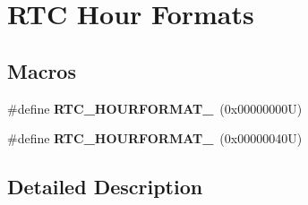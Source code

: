 \hypertarget{group___r_t_c___hour___formats}{}\section{R\+TC Hour Formats}
\label{group___r_t_c___hour___formats}
\subsection*{Macros}
\begin{DoxyCompactItemize}
\item 
\mbox{\label{group___r_t_c___hour___formats_gab1a861fd858a55a6e815be4585c413d5}} 
\#define {\bfseries R\+T\+C\+\_\+\+H\+O\+U\+R\+F\+O\+R\+M\+A\+T\+\_}~(0x00000000\+U)
\item 
\mbox{\label{group___r_t_c___hour___formats_ga8da8ecb55e286c410dbf1297a81125ae}} 
\#define {\bfseries R\+T\+C\+\_\+\+H\+O\+U\+R\+F\+O\+R\+M\+A\+T\+\_}~(0x00000040\+U)
\end{DoxyCompactItemize}


\subsection{Detailed Description}
